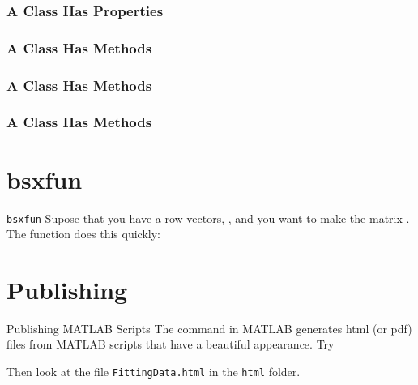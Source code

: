 \documentclass[12pt, compress,xcolor={usenames,dvipsnames}]{beamer} %
\newcommand{\Matlab}{MATLAB\xspace}
\begin{document}
\begin{frame}[fragile]\frametitle{A Class Has Properties}
	\vspace{-8ex}
		
\end{frame}

\begin{frame}[fragile]\frametitle{A Class Has Methods}
	\vspace{-8ex}
		
\end{frame}

\begin{frame}[fragile]\frametitle{A Class Has Methods}
	\vspace{-8ex}
		
\end{frame}

\begin{frame}[fragile]\frametitle{A Class Has Methods}
	\vspace{-8ex}
		
\end{frame}

\section{bsxfun}

\begin{frame}{\texttt{bsxfun}}
	\vspace{-4ex}
	Supose that you have a row vectors, , and you want to make the matrix .  The function  does this quickly:
	\vspace{-2ex}
	
\end{frame}

\section{Publishing}

\begin{frame}{Publishing \Matlab Scripts}
		The  command in \Matlab generates html (or pdf) files from \Matlab scripts that have a beautiful appearance.  Try 
		
		\bigskip
		
		
		\bigskip
		
		Then look at the file \texttt{FittingData.html} in the \texttt{html} folder.
		
\end{frame}
\end{document}

